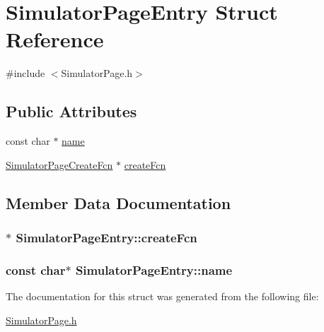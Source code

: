 \hypertarget{structSimulatorPageEntry}{\section{Simulator\-Page\-Entry Struct Reference}
\label{structSimulatorPageEntry}
}


{\ttfamily \#include $<$Simulator\-Page.\-h$>$}

\subsection*{Public Attributes}
\begin{DoxyCompactItemize}
\item 
const char $\ast$ \hyperlink{structSimulatorPageEntry_a173a2f93db826db4e0aff9ec05a8e09a}{name}
\item 
\hyperlink{SimulatorPage_8h_af4a572735f936f8e0960d22951246d22}{Simulator\-Page\-Create\-Fcn} $\ast$ \hyperlink{structSimulatorPageEntry_a6031bb99b2ae7891b4668e2ebf94fa55}{create\-Fcn}
\end{DoxyCompactItemize}


\subsection{Member Data Documentation}
\hypertarget{structSimulatorPageEntry_a6031bb99b2ae7891b4668e2ebf94fa55}{
\subsubsection[{create\-Fcn}]{$\ast$ Simulator\-Page\-Entry\-::create\-Fcn}}\label{structSimulatorPageEntry_a6031bb99b2ae7891b4668e2ebf94fa55}
\hypertarget{structSimulatorPageEntry_a173a2f93db826db4e0aff9ec05a8e09a}{
\subsubsection[{name}]{\setlength{\rightskip}{0pt plus 5cm}const char$\ast$ Simulator\-Page\-Entry\-::name}}\label{structSimulatorPageEntry_a173a2f93db826db4e0aff9ec05a8e09a}


The documentation for this struct was generated from the following file\-:\begin{DoxyCompactItemize}
\item 
\hyperlink{SimulatorPage_8h}{Simulator\-Page.\-h}\end{DoxyCompactItemize}
